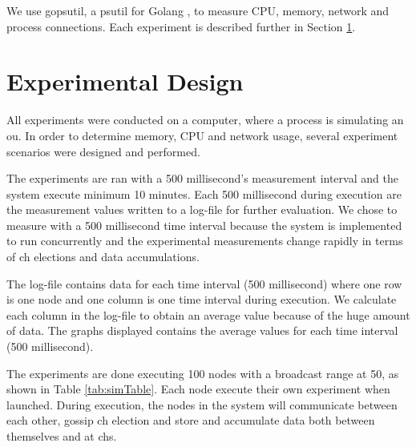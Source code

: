 \documentclass[USenglish]{uit-thesis}
\begin{document}
We use gopsutil, a psutil for Golang \cite{golangPsutil}, to measure CPU, memory, network and process connections. Each experiment is described further in Section \ref{eva:exp_des}.

\section{Experimental Design} \label{eva:exp_des}

All experiments were conducted on a computer, where a process is simulating an \gls{ou}. In order to determine memory, CPU and network usage, several experiment scenarios were designed and performed.

The experiments are ran with a 500 millisecond's measurement interval and the system execute minimum 10 minutes. Each 500 millisecond during execution are the measurement values written to a log-file for further evaluation. We chose to measure with a 500 millisecond time interval because the system is implemented to run concurrently and the experimental measurements change rapidly in terms of \gls{ch} elections and data accumulations. 

The log-file contains data for each time interval (500 millisecond) where  one row is one node and one column is one time interval during execution. We calculate each column in the log-file to obtain an average value because of the huge amount of data. The graphs displayed contains the average values for each time interval (500 millisecond).

The experiments are done executing 100 nodes with a broadcast range at 50, as shown in Table \ref{tab:simTable}. Each node execute their own experiment when launched. During execution, the nodes in the system will communicate between each other, gossip \gls{ch} election and store and accumulate data both between themselves and at \gls{ch}s.
\end{document}
